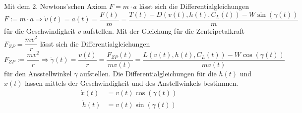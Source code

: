 Mit dem 2. Newtons'schen Axiom $F = m \cdot a$ lässt sich die Differentialgleichungen
\[F := m \cdot a \Rightarrow \dot{v}(t) = a(t) = \dfrac{F(t)}{m} = \dfrac{T(t) - D(v(t),h(t),C_L(t)) - W \sin(\gamma(t))}{m}\]
für die Geschwindigkeit $v$ aufstellen.
Mit der Gleichung für die Zentripetalkraft $F_{ZP} = \dfrac{m v^2}{r}$ lässt sich die Differentialgleichungen
\[F_{ZP} := \dfrac{m v^2}{r} \Rightarrow \dot{\gamma}(t) = \dfrac{v(t)}{r} = \dfrac{F_{ZP}(t)}{m v(t)} = \dfrac{L(v(t),h(t),C_L(t)) - W \cos(\gamma(t))}{m v(t)}\]
für den Ansstellwinkel $\gamma$ aufstellen.
Die Differentialgleichungen für die $h(t)$ und $x(t)$ lassen mittels der Geschwindigkeit und des Anstellwinkels bestimmen.
\[\begin{split}
    \dot{x}(t) &= v(t) \cos(\gamma(t))\\\
    \dot{h}(t) &= v(t) \sin(\gamma(t))
\end{split} \]


